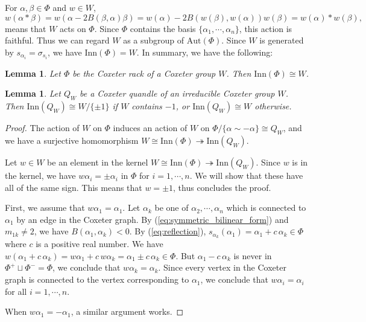 \documentclass{amsart}
\newtheorem{lemma}[theorem]{Lemma}
\theoremstyle{definition}
\theoremstyle{remark}
\numberwithin{equation}{section}
\begin{document}
For $\alpha, \beta \in \Phi$ and $w \in W$, 
\[
w (\alpha * \beta) 
= w ( \alpha - 2 B(\beta, \alpha) \beta)
= w (\alpha) - 2 B(w(\beta), w(\alpha)) w (\beta)
= w(\alpha) * w(\beta),
\]
means that $W$ acts on $\Phi$.
Since $\Phi$ contains the basis $\{ \alpha_1, \cdots , \alpha_n \}$, 
this action is faithful.
Thus we can regard $W$ as a subgroup of $\mathrm{Aut}(\Phi)$.
Since $W$ is generated by $s_{\alpha_i} = \sigma_{s_i}$, 
we have $\mathrm{Inn} (\Phi) = W$.
In summary, we have the following:
\begin{lemma}
\label{lem:inner_automorphism_group_of_coxeter_rack}
Let $\Phi$ be the Coxeter rack of a Coxeter group $W$.
Then $\mathrm{Inn} (\Phi) \cong W$.
\end{lemma}

\begin{lemma}
\label{lem:inner_automorphism_group_of_coxeter_quandle}
Let $Q_W$ be a Coxeter quandle of an irreducible Coxeter group $W$.
Then $\mathrm{Inn} (Q_W) \cong W / \{ \pm 1 \}$ if $W$ contains $-1$, 
or $\mathrm{Inn} (Q_W) \cong W$ otherwise.
\end{lemma}
\begin{proof}
The action of $W$ on $\Phi$ induces an action of $W$
on $\Phi/\{ \alpha \sim -\alpha \} \cong Q_W$, and we have a surjective homomorphism 
$W \cong  \mathrm{Inn} (\Phi) \twoheadrightarrow \mathrm{Inn} (Q_W)$.

Let $w \in W$ be an element in the kernel 
$W \cong \mathrm{Inn} (\Phi) \twoheadrightarrow \mathrm{Inn} (Q_W)$.
Since $w$ is in the kernel, we have $w \alpha_i = \pm \alpha_i$  in $\Phi$ 
for $i = 1, \cdots , n$. 
We will show that these have all of the same sign. 
This means that $w = \pm 1$, thus concludes the proof.

First, we assume that $w \alpha_1 = \alpha_1$.
Let $\alpha_k$ be one of $\alpha_2, \cdots , \alpha_n$ 
which is connected to $\alpha_1$ by an edge in the Coxeter graph. 
By (\ref{eq:symmetric_bilinear_form}) and $m_{1k} \neq 2$, 
we have $B(\alpha_1, \alpha_k) < 0$. 
By (\ref{eq:reflection}), 
$s_{\alpha_k} (\alpha_1) = \alpha_1 + c \, \alpha_k \in \Phi$ 
where $c$ is a positive real number.
We have $w (\alpha_1 + c \, \alpha_k) = w \alpha_1 + c \, w \alpha_k 
= \alpha_1 \pm c \, \alpha_k \in \Phi$.
But $\alpha_1 - c \, \alpha_k$ is never in $\Phi^+ \sqcup \Phi^- = \Phi$, 
we conclude that $w \alpha_k = \alpha_k$.
Since every vertex in the Coxeter graph is connected to the vertex corresponding 
to $\alpha_1$, we conclude that $w \alpha_i = \alpha_i$ for all $i = 1, \cdots , n$.

When $w \alpha_1 = -\alpha_1$, a similar argument works.
\end{proof}
\end{document}
